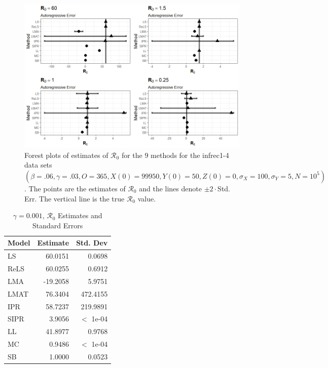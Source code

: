 \documentclass[12pt]{article}
\newcommand{\xxsir}{\ensuremath{9} } %
\newcommand{\rr}{\ensuremath{\mathcal{R}_0}}
\begin{document}
\begin{figure}[H]
	\centering
	\includegraphics[scale=0.5]{images/parchange_ar.jpeg}
	\caption{Forest plots of estimates of $\rr$ for the \xxsir methods for the infrec1-4 data sets $(\beta=.06, \gamma=.03, O=365, X(0)=99950, Y(0)=50, Z(0)=0, \sigma_X=100, \sigma_Y=5, N=10^5)$.  The points are the estimates of $\rr$ and the lines denote $\pm 2\cdot $Std. Err.  The vertical line is the true $\rr$ value.}
\end{figure}
\begin{table}[H]
	
	\centering
	\begin{tabular}[t]{l|r|r}
		\hline
		Model & Estimate & Std. Dev\\
		\hline
		LS & 60.0151 & 0.0698\\
		\hline
		ReLS & 60.0255 & 0.6912\\
		\hline
		LMA & -19.2058 & 5.9751\\
		\hline
		LMAT & 76.3404 & 472.4155\\
		\hline
		IPR & 58.7237 & 219.9891\\
		\hline
		SIPR & 3.9056 & $<$ 1e-04\\
		\hline
		LL & 41.8977 & 0.9768\\
		\hline
		MC & 0.9486 & $<$ 1e-04\\
		\hline
		SB & 1.0000 & 0.0523\\
		\hline
	\end{tabular}
	\caption{$\gamma = 0.001$, $\rr$ Estimates and Standard Errors}
\end{table}
\end{document}
